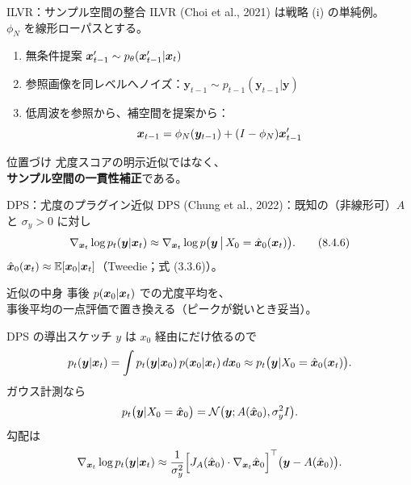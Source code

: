 \begin{frame}{ILVR：サンプル空間の整合}
    ILVR (Choi et al., 2021) は戦略 (i) の単純例。\\
    $\phi_N$ を線形ローパスとする。
    \begin{enumerate}
        \item 無条件提案 $\bm{x}'_{t-1}\sim p_\theta(\bm{x}'_{t-1}|\bm{x}_t)$
        \item 参照画像を同レベルへノイズ：$ \bm{y}_{t-1}\sim p_{t-1}(\bm{y}_{t-1}|\bm{y})$
        \item 低周波を参照から、補空間を提案から：
        \[
            \bm{x}_{t-1}=\phi_N(\bm{y}_{t-1})+(I-\phi_N)\bm{x}'_{t-1}
        \]
    \end{enumerate}
    \begin{exampleblock}{位置づけ}
        尤度スコアの明示近似ではなく、\\
        \textbf{サンプル空間の一貫性補正}である。
    \end{exampleblock}
\end{frame}
\asmain
\begin{frame}{DPS：尤度のプラグイン近似}
    DPS (Chung et al., 2022)：既知の（非線形可）$A$ と $\sigma_y>0$ に対し
    \[
        \nabla_{\bm{x}_t}\log p_t(\bm{y}|\bm{x}_t)
        \approx
        \nabla_{\bm{x}_t}\log p\bigl(\bm{y}\,\big|\,X_0=\hat{\bm{x}}_0(\bm{x}_t)\bigr).
        \tag{8.4.6}
    \]
    $\hat{\bm{x}}_0(\bm{x}_t)\approx\mathbb{E}[\bm{x}_0|\bm{x}_t]$（Tweedie；式 (3.3.6)）。
    \begin{alertblock}{近似の中身}
        事後 $p(\bm{x}_0|\bm{x}_t)$ での尤度平均を、\\
        事後平均の一点評価で置き換える（ピークが鋭いとき妥当）。
    \end{alertblock}
\end{frame}
\asmain
\begin{frame}{DPS の導出スケッチ}
    $y$ は $x_0$ 経由にだけ依るので
    \[
        p_t(\bm{y}|\bm{x}_t)
        =
        \int p_t(\bm{y}|\bm{x}_0)\,p(\bm{x}_0|\bm{x}_t)\,d\bm{x}_0
        \approx
        p_t\bigl(\bm{y}|X_0=\hat{\bm{x}}_0(\bm{x}_t)\bigr).
    \]
    ガウス計測なら
    \[
        p_t\bigl(\bm{y}|X_0=\hat{\bm{x}}_0\bigr)
        =
        \mathcal{N}\bigl(\bm{y};A(\hat{\bm{x}}_0),\sigma_y^{2}I\bigr).
    \]
    勾配は
    \[
        \nabla_{\bm{x}_t}\log p_t(\bm{y}|\bm{x}_t)
        \approx
        \frac{1}{\sigma_y^{2}}
        \Bigl[
            J_A(\hat{\bm{x}}_0)\cdot\nabla_{\bm{x}_t}\hat{\bm{x}}_0
        \Bigr]^{\top}
        \bigl(\bm{y}-A(\hat{\bm{x}}_0)\bigr).
    \]
\end{frame}
